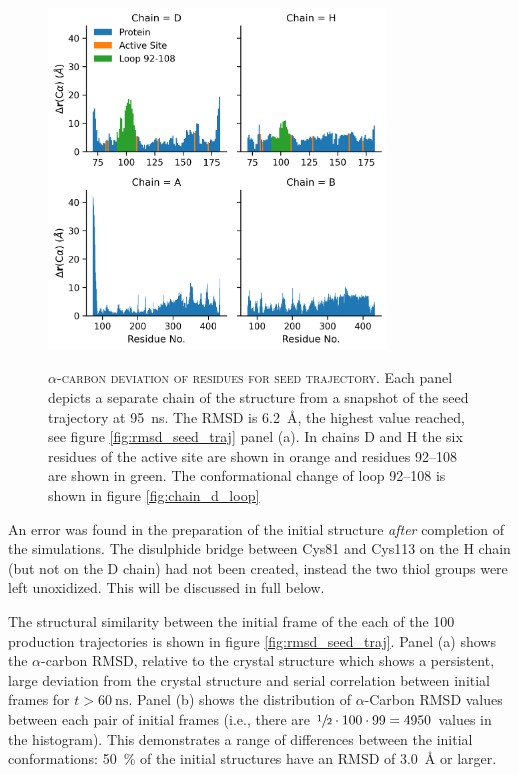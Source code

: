 \begin{figure}
    \centering
    \caption[alpha-carbon deviation of residues from the seed trajectory]{\textsc{$\alpha$-carbon deviation of residues for seed trajectory}. Each panel depicts a separate chain of the structure from a snapshot of the seed trajectory at \SI{95}{\nano\second}. The RMSD is \SI{6.2}{\angstrom}, the highest value reached, see figure \ref{fig:rmsd_seed_traj} panel (a). In chains D and H the six residues of the active site are shown in orange and residues \numrange[range-phrase=--]{92}{108} are shown in green. The conformational change of loop \numrange[range-phrase=--]{92}{108} is shown in figure \ref{fig:chain_d_loop}}
    \includegraphics[width=0.8\textwidth]{chapters/aadh/figures/rmsd_by_res.png}
    \label{fig:aadh_rmsd_byres}
\end{figure}

An error was found in the preparation of the initial structure \emph{after} completion of the simulations. The disulphide bridge between Cys81 and Cys113 on the H chain (but not on the D chain) had not been created, instead the two thiol groups were left unoxidized. This will be discussed in full below. 

 The structural similarity between the initial frame of the each of the 100 production trajectories is shown in figure \ref{fig:rmsd_seed_traj}. Panel (a) shows the $\alpha$-carbon RMSD, relative to the crystal structure which shows a persistent, large deviation from the crystal structure and serial correlation between initial frames for $t>\SI{60}{\nano\second}$.  Panel (b) shows the distribution of $\alpha$-Carbon RMSD values between each pair of initial frames (i.e., there are $\sfrac{1}{2}\cdot 100\cdot 99 = 4950$ values in the histogram). This demonstrates a range of differences between the initial conformations: \SI{50}{\percent} of the initial structures have an RMSD of \SI{3.0}{\angstrom} or larger.  
 
